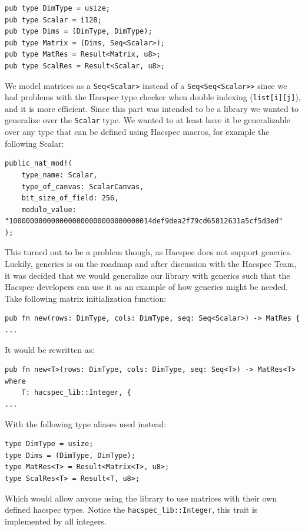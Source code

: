 \documentclass{article}
\begin{document}
\begin{lstlisting}
pub type DimType = usize;
pub type Scalar = i128;
pub type Dims = (DimType, DimType);
pub type Matrix = (Dims, Seq<Scalar>);
pub type MatRes = Result<Matrix, u8>;
pub type ScalRes = Result<Scalar, u8>;
\end{lstlisting}

We model matrices as a \texttt{Seq<Scalar>} instead of a
\texttt{Seq<Seq<Scalar>>} since we had problems with the Hacspec type
checker when double indexing (\texttt{list[i][j]}), and it is more
efficient. Since this part was intended to be a library we wanted to
generalize over the \texttt{Scalar} type. We wanted to at least have
it be generalizable over any type that can be defined using Hacspec
macros, for example the following Scalar:

\begin{lstlisting}
public_nat_mod!(
	type_name: Scalar,
	type_of_canvas: ScalarCanvas,
	bit_size_of_field: 256,
	modulo_value: "1000000000000000000000000000000014def9dea2f79cd65812631a5cf5d3ed"
);
\end{lstlisting}

This turned out to be a problem though, as Hacspec does not support
generics. Luckily, generics is on the roadmap and after discussion
with the Hacspec Team, it was decided that we would generalize our
library with generics such that the Hacspec developers can use it
as an example of how generics might be needed. Take following matrix
initialization function:

\begin{lstlisting}
pub fn new(rows: DimType, cols: DimType, seq: Seq<Scalar>) -> MatRes {
...
\end{lstlisting}

It would be rewritten as:

\begin{lstlisting}
pub fn new<T>(rows: DimType, cols: DimType, seq: Seq<T>) -> MatRes<T>
where
	T: hacspec_lib::Integer, {
...
\end{lstlisting}

With the following type aliases used instead:

\begin{lstlisting}
type DimType = usize;
type Dims = (DimType, DimType);
type MatRes<T> = Result<Matrix<T>, u8>;
type ScalRes<T> = Result<T, u8>;
\end{lstlisting}

Which would allow anyone using the library to use matrices with their
own defined hacspec types. Notice the \texttt{hacspec\_lib::Integer},
this trait is implemented by all integers.
\end{document}
